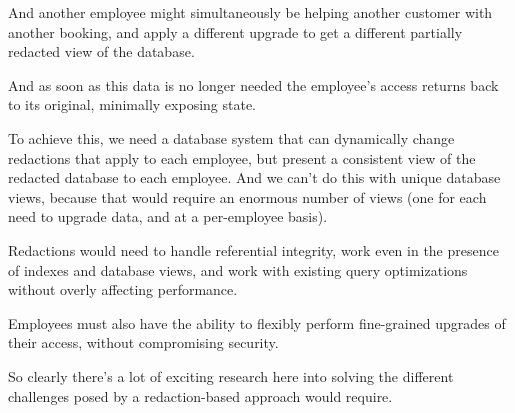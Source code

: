 And another employee might simultaneously be helping another customer with
another booking, and apply a different upgrade to get a different partially
redacted view of the database.

And as soon as this data is no longer needed the employee’s access returns back
to its original, minimally exposing state.

To achieve this, we need a database system that can dynamically change
redactions that apply to each employee, but present a consistent view of the
redacted database to each employee.  And we can’t do this with unique database
views, because that would require an enormous number of views (one for each need
to upgrade data, and at a per-employee basis).

Redactions would need to handle referential integrity, work even in the presence
of indexes and database views, and work with existing query optimizations
without overly affecting performance.

Employees must also have the ability to flexibly perform fine-grained upgrades
of their access, without compromising security.

So clearly there’s a lot of exciting research here into solving the different
challenges posed by a redaction-based approach would require.


